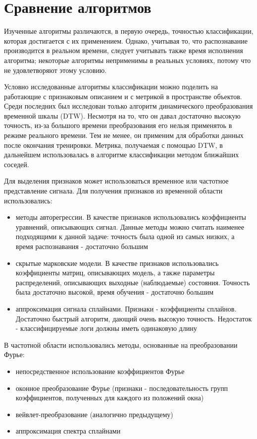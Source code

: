 \section{Сравнение алгоритмов}

Изученные алгоритмы различаются, в первую очередь, точностью классификации, которая достигается с их применением. Однако, учитывая то, что распознавание производится в реальном времени, следует учитывать также время исполнения алгоритма; некоторые алгоритмы неприменимы в реальных условиях, потому что не удовлетворяют этому условию.

Условно исследованные алгоритмы классификации можно поделить на работающие с признаковым описанием и с метрикой в пространстве объектов. Среди последних был исследован только алгоритм динамического преобразования временной шкалы (DTW). Несмотря на то, что он давал достаточно высокую точность, из-за большого времени преобразования его нельзя применятоь в режиме реального времени. Тем не менее, он применим для обработки данных после окончания тренировки. Метрика, получаемая с помощью DTW, в дальнейшем использовалась в алгоритме классификации методом ближайших соседей.

Для выделения признаков может использоваться временное или частотное представление сигнала. Для получения признаков из временной области использовались:
\begin{itemize}
\item методы авторегрессии. В качестве признаков использовались коэффициенты уравнений, описывающих сигнал. Данные методы можно считать наименее подходящими к данной задаче: точность была одной из самых низких, а время распознавания - достаточно большим
\item скрытые марковские модели. В качестве признаков использовались коэффициенты матриц, описывающих модель, а также параметры распределений, описывающих выходные (наблюдаемые) состояния. Точность была достаточно высокой, время обучения - достаточно большим
\item аппроксимация сигнала сплайнами. Признаки - коэффициенты сплайнов. Достаточно быстрый алгоритм, дающий очень высокую точность. Недостаток - классифицируемые логи должны иметь одинаковую длину
\end{itemize}

В частотной области использовались методы, основанные на преобразовании Фурье:
\begin{itemize}
\item непосредственное использование коэффициентов Фурье
\item оконное преобразование Фурье (признаки - последовательность групп коэффициентов, полученных для каждого из положений окна)
\item вейвлет-преобразование (аналогично предыдущему)
\item аппроксимация спектра сплайнами
\end{itemize}


